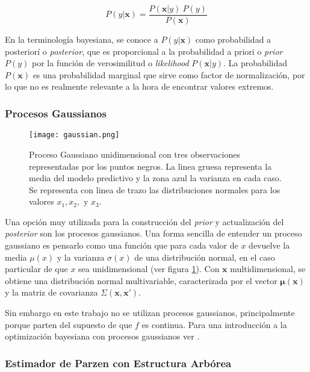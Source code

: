  \[
 P(y|\textbf{x}) = \frac{P(\textbf{x}|y) \ P(y)}{P(\textbf{x})}
 \]
 
 En la terminología bayesiana, se conoce a $P(y|\textbf{x})$ como probabilidad a posteriorí o \textit{posterior}, que es proporcional a la probabilidad a priori o \textit{prior} $P(y)$ por la función de verosimilitud o \textit{likelihood} $P(\textbf{x}|y)$. La probabilidad $P(\textbf{x})$ es una probabilidad marginal que sirve como factor de normalización, por lo que no es realmente relevante a la hora de encontrar valores extremos.


\subsubsection*{Procesos Gaussianos}

\begin{figure}[h!]
\centering
\texttt{[image: gaussian.png]}
\caption{Proceso Gaussiano unidimensional con tres observaciones representadas por los puntos negros. La linea gruesa representa la media del modelo predictivo y la zona azul la varianza en cada caso. Se representa con linea de trazo las distribuciones normales para los valores $x_1, x_2,$ y $x_3$\cite{https://doi.org/10.48550/arxiv.1012.2599}.}
\label{fig:gaussian}
\end{figure}

Una opción muy utilizada para la construcción del \textit{prior} y actualización del \textit{posterior} son los procesos gaussianos. Una forma sencilla de entender un proceso gaussiano es pensarlo como una función que para cada valor de $x$ devuelve la media $\mu(x)$ y la varianza $\sigma(x)$ de una distribución normal, en el caso particular de que $x$ sea unidimensional (ver figura \ref{fig:gaussian}). Con $\textbf{x}$ multidimensional, se obtiene una distribución normal multivariable, caracterizada por el vector $\bm{\mu}(\textbf{x})$ y la matriz de covarianza $\Sigma(\textbf{x}, \textbf{x}')$.

Sin embargo en este trabajo no se utilizan procesos gaussianos, principalmente porque parten del supuesto de que $f$ es continua. Para una introducción a la optimización bayesiana con procesos gaussianos ver \cite{https://doi.org/10.48550/arxiv.1012.2599}.

\subsubsection*{Estimador de Parzen con Estructura Arbórea} 
 
